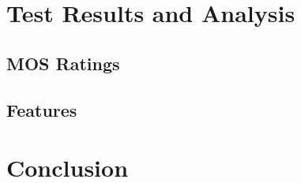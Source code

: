 \documentclass[conference,compsoc]{IEEEtran}
\begin{document}
\section{Test Results and Analysis}

\subsection{MOS Ratings}
\label{sec:ratings}


\subsection{Features}
\label{sec:features}


\section{Conclusion}







\end{document}
